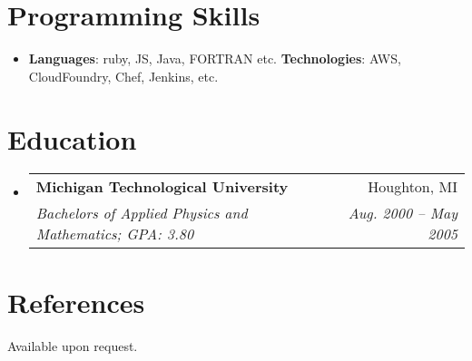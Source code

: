 \documentclass[letterpaper,12pt]{article}
\makeatletter
\newcommand{\resumeSubheading}[4]{
  \vspace{-1pt}\item{
    \begin{tabular*}{0.97\textwidth}{l@{\extracolsep{\fill}}r}
      \textbf{#1} & #2 \\
      \textit{\small#3} & \textit{\small #4} \\
    \end{tabular*}\vspace{-5pt}}
}
\newcommand{\resumeSubHeadingListStart}{\begin{itemize}[leftmargin=*]}
\newcommand{\resumeSubHeadingListEnd}{\end{itemize}}
\makeatother
\begin{document}
\section{Programming Skills}
\resumeSubHeadingListStart
\item{
    \textbf{Languages}{: ruby, JS, Java, FORTRAN etc.}
    \hfill
    \textbf{Technologies}{: AWS, CloudFoundry, Chef, Jenkins, etc.}
  }
  \resumeSubHeadingListEnd

  \section{Education}
  \resumeSubHeadingListStart
  \resumeSubheading
  {Michigan Technological University}{Houghton, MI}
  {Bachelors of Applied Physics and Mathematics;  GPA: 3.80}{Aug. 2000 -- May 2005}
  \resumeSubHeadingListEnd


  \section{References}
  Available upon request.

\end{document}
